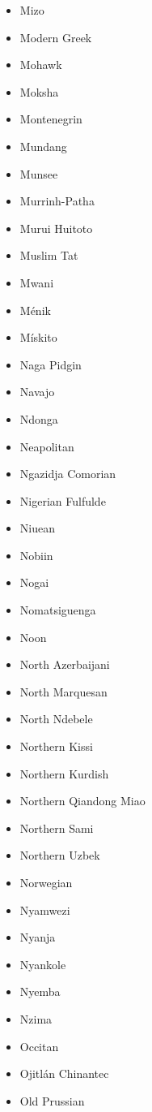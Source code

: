 \documentclass[paper=a4, 10pt]{scrbook}
\begin{document}
\begin{multicols}{3}
\begin{itemize}
        \item Mizo
        \item Modern Greek
        \item Mohawk
        \item Moksha
        \item Montenegrin
        \item Mundang
        \item Munsee
        \item Murrinh-Patha
        \item Murui Huitoto
        \item Muslim Tat
        \item Mwani
        \item Ménik
        \item Mískito
        \item Naga Pidgin
        \item Navajo
        \item Ndonga
        \item Neapolitan
        \item Ngazidja Comorian
        \item Nigerian Fulfulde
        \item Niuean
        \item Nobiin
        \item Nogai
        \item Nomatsiguenga
        \item Noon
        \item North Azerbaijani
        \item North Marquesan
        \item North Ndebele
        \item Northern Kissi
        \item Northern Kurdish
        \item Northern Qiandong Miao
        \item Northern Sami
        \item Northern Uzbek
        \item Norwegian
        \item Nyamwezi
        \item Nyanja
        \item Nyankole
        \item Nyemba
        \item Nzima
        \item Occitan
        \item Ojitlán Chinantec
        \item Old Prussian

\end{itemize}
\end{multicols}
\end{document}
